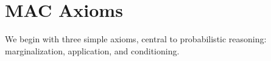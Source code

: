 \documentclass[dyna.tex]{subfiles}
\begin{document}
    \section{MAC Axioms}
    We begin with three simple axioms, central to probabilistic reasoning: marginalization, application, and conditioning.

    
\end{document}
